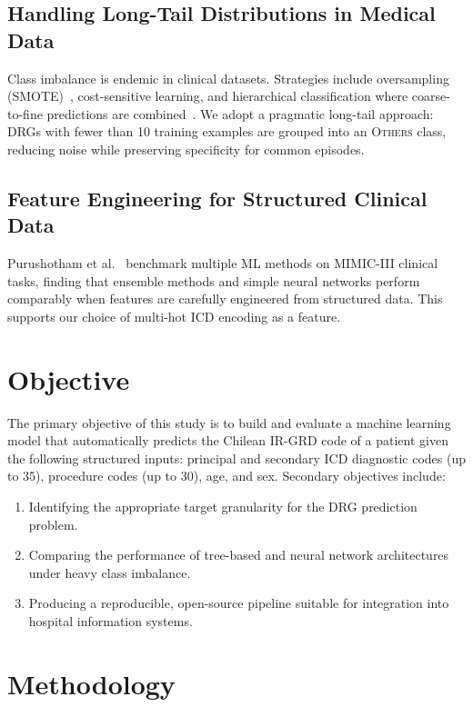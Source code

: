 \documentclass{IEEEtran}
\begin{document}
\subsection{Handling Long-Tail Distributions in Medical Data}
Class imbalance is endemic in clinical datasets.
Strategies include oversampling (SMOTE)~\cite{chawla2002smote},
cost-sensitive learning, and hierarchical classification where
coarse-to-fine predictions are combined~\cite{chen2019hiagm}.
We adopt a pragmatic long-tail approach: DRGs with fewer than
10 training examples are grouped into an \textsc{Others} class,
reducing noise while preserving specificity for common episodes.

\subsection{Feature Engineering for Structured Clinical Data}
Purushotham et al.~\cite{purushotham2018benchmarking} benchmark
multiple ML methods on MIMIC-III clinical tasks, finding that
ensemble methods and simple neural networks perform comparably
when features are carefully engineered from structured data.
This supports our choice of multi-hot ICD encoding as a feature.

\section{Objective}

The primary objective of this study is to build and evaluate a
machine learning model that automatically predicts the Chilean
IR-GRD code of a patient given the following structured inputs:
principal and secondary ICD diagnostic codes (up to 35),
procedure codes (up to 30), age, and sex.
Secondary objectives include:
\begin{enumerate}
  \item Identifying the appropriate target granularity for the
        DRG prediction problem.
  \item Comparing the performance of tree-based and neural network
        architectures under heavy class imbalance.
  \item Producing a reproducible, open-source pipeline suitable
        for integration into hospital information systems.
\end{enumerate}

\section{Methodology}
\label{sec:method}
\end{document}
